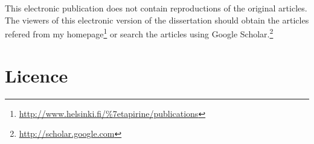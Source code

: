 \documentclass[officiallayout,final]{unihelcompling}
\newif\ifprintversion
\begin{document}
\else
This electronic publication does not contain reproductions of the original
articles. The viewers of this electronic
version of the dissertation should obtain the articles refered from my
homepage\footnote{\url{http://www.helsinki.fi/\%7etapirine/publications}} or
        search the articles using Google
        Scholar.\footnote{\url{http://scholar.google.com}}
\fi

\section{Licence}
\label{appendix:licence}
\ifprintversion



\else



\fi
\end{document}
